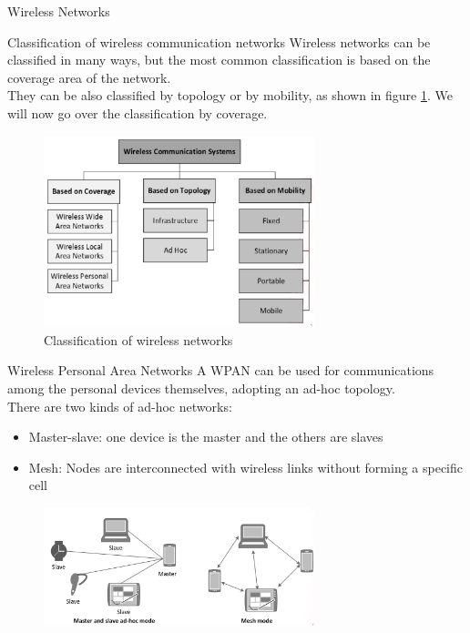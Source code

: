 \begin{section}{Wireless Networks}
\begin{figure}[H]
  \end{figure}
  \begin{subsection}{Classification of wireless communication networks}
    Wireless networks can be classified in many ways, but the most common classification is based on
    the coverage area of the network.\\
    They can be also classified by topology or by mobility, as shown in figure \ref{fig:network classification}.
    We will now go over the classification by coverage.
    \begin{figure}[h]
      \centering
      \includegraphics[width=0.7\textwidth]{img/wireless/network classification.png}
      \caption{Classification of wireless networks}
      \label{fig:network classification}
    \end{figure}
    \begin{subsubsection}{Wireless Personal Area Networks}
      A WPAN can be used for communications among the personal devices themselves, adopting an ad-hoc 
      topology.\\
      There are two kinds of ad-hoc networks:
      \begin{itemize}
        \item Master-slave: one device is the master and the others are slaves
        \item Mesh: Nodes are interconnected with wireless links without forming a specific cell
      \end{itemize}
      \begin{figure}
        \centering
        \includegraphics[width=0.7\textwidth]{img/wireless/wpan.png}

\end{figure}
\end{subsubsection}
\end{subsection}
\end{section}
